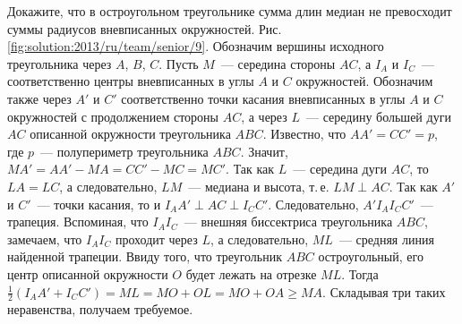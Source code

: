 \problem{}
Докажите, что в остроугольном треугольнике сумма длин медиан не превосходит
суммы радиусов вневписанных окружностей.
%
\label{solution:2013/ru/team/senior/9}
Рис. \ref{fig:solution:2013/ru/team/senior/9}.
Обозначим вершины исходного треугольника через $A$, $B$, $C$.
Пусть $M$~--- середина стороны $AC$, а $I_A$ и $I_C$~--- соответственно центры
вневписанных в углы $A$ и $C$ окружностей.
Обозначим также через $A'$ и $C'$ соответственно точки касания вневписанных в
углы $A$ и $C$ окружностей с продолжением стороны $AC$, а через $L$~---
середину большей дуги $AC$ описанной окружности треугольника $ABC$.
Известно, что $AA' = CC' = p$, где $p$~--- полупериметр треугольника $ABC$.
Значит, $MA' = AA' - MA = CC' - MC = MC'$.
Так как $L$~--- середина дуги $AC$, то $LA = LC$, а следовательно, $LM$~---
медиана и высота, т.\,е. $LM \perp AC$.
Так как $A'$ и $C'$~--- точки касания, то и $I_A A' \perp AC \perp I_C C'$.
Следовательно, $A' I_A I_C C'$~--- трапеция.
Вспоминая, что $I_A I_C$~--- внешняя биссектриса треугольника $ABC$, замечаем,
что $I_A I_C$ проходит через $L$, а следовательно, $ML$~--- средняя линия
найденной трапеции.
Ввиду того, что треугольник $ABC$ остроугольный, его центр описанной окружности
$O$ будет лежать на отрезке $ML$.
Тогда $\frac{1}{2} (I_A A' + I_C C') = ML = MO + OL = MO + OA \geq MA$.
Складывая три таких неравенства, получаем требуемое.
\endproblem
